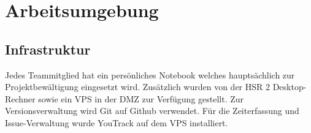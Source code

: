 \section{Arbeitsumgebung}
\label{sec:Arbeitsumgebung}

\subsection{Infrastruktur}
Jedes Teammitglied hat ein persönliches Notebook welches hauptsächlich zur Projektbewältigung eingesetzt wird. Zusätzlich wurden von der \acs{HSR} 2 Desktop-Rechner sowie ein \acs{VPS} in der DMZ zur Verfügung gestellt.
Zur Versionsverwaltung wird Git auf Github verwendet. Für die Zeiterfassung und Issue-Verwaltung wurde YouTrack auf dem \acs{VPS} installiert.



